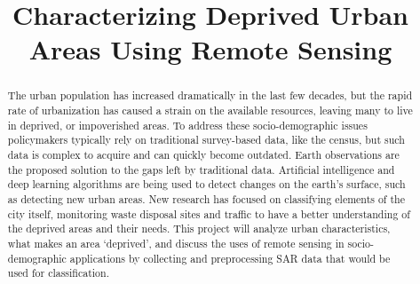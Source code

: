 \documentclass[conference]{IEEEtran}
\begin{document}
	
	\title{Characterizing Deprived Urban Areas Using Remote Sensing}

	\author{
	}

	\maketitle

	\begin{abstract}
		The urban population has increased dramatically in the last few decades, but the rapid rate of urbanization has caused a strain on the available resources, leaving many to live in deprived, or impoverished areas.
		To address these socio-demographic issues policymakers typically rely on traditional survey-based data, like the census, but such data is complex to acquire and can quickly become outdated. Earth observations are the proposed solution to the gaps left by traditional data.
		Artificial intelligence and deep learning algorithms are being used to detect changes on the earth's surface, such as detecting new urban areas.
		New research has focused on classifying elements of the city itself, monitoring waste disposal sites and traffic to have a better understanding of the deprived areas and their needs.
		This project will analyze urban characteristics, what makes an area ‘deprived’, and discuss the uses of remote sensing in socio-demographic applications by collecting and preprocessing SAR data that would be used for classification.

	\end{abstract}

\end{document}
